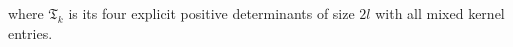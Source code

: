 where $\mathfrak T_k$ is its four explicit positive
determinants of size $2l$ with all mixed kernel entries.